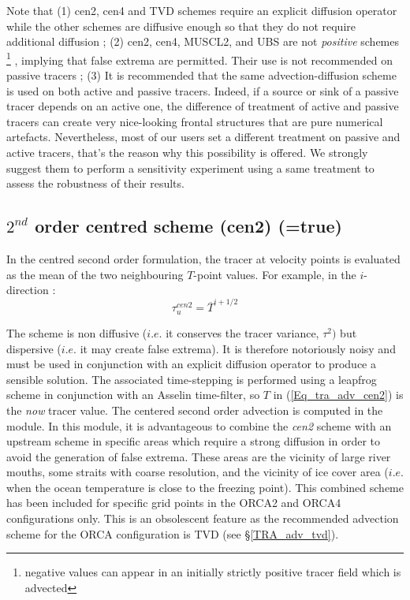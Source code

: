Note that 
(1) cen2, cen4 and TVD schemes require an explicit diffusion 
operator while the other schemes are diffusive enough so that they do not 
require additional diffusion ; 
(2) cen2, cen4, MUSCL2, and UBS are not \textit{positive} schemes
\footnote{negative values can appear in an initially strictly positive tracer field 
which is advected}
, implying that false extrema are permitted. Their use is not recommended on passive tracers ; 
(3) It is recommended that the same advection-diffusion scheme is 
used on both active and passive tracers. Indeed, if a source or sink of a 
passive tracer depends on an active one, the difference of treatment of 
active and passive tracers can create very nice-looking frontal structures 
that are pure numerical artefacts. Nevertheless, most of our users set a different 
treatment on passive and active tracers, that's the reason why this possibility 
is offered. We strongly suggest them to perform a sensitivity experiment 
using a same treatment to assess the robustness of their results.

\subsection   [$2^{nd}$ order centred scheme (cen2) (\np{ln\_traadv\_cen2})]
			{$2^{nd}$ order centred scheme (cen2) (=true)}
\label{TRA_adv_cen2}

In the centred second order formulation, the tracer at velocity points is 
evaluated as the mean of the two neighbouring $T$-point values. 
For example, in the $i$-direction :
\begin{equation} \label{Eq_tra_adv_cen2}
\tau _u^{cen2} =\overline T ^{i+1/2}
\end{equation}

The scheme is non diffusive ($i.e.$ it conserves the tracer variance, $\tau^2)$ 
but dispersive ($i.e.$ it may create false extrema). It is therefore notoriously 
noisy and must be used in conjunction with an explicit diffusion operator to 
produce a sensible solution. The associated time-stepping is performed using 
a leapfrog scheme in conjunction with an Asselin time-filter, so $T$ in 
(\ref{Eq_tra_adv_cen2}) is the \textit{now} tracer value. The centered second 
order advection is computed in the  module. In this module,
it is advantageous to combine the \textit{cen2} scheme with an upstream scheme
in specific areas which require a strong diffusion in order to avoid the generation 
of false extrema. These areas are the vicinity of large river mouths, some straits 
with coarse resolution, and the vicinity of ice cover area ($i.e.$ when the ocean 
temperature is close to the freezing point).
This combined scheme has been included for specific grid points in the ORCA2 
and ORCA4 configurations only. This is an obsolescent feature as the recommended 
advection scheme for the ORCA configuration is TVD (see  \S\ref{TRA_adv_tvd}).

